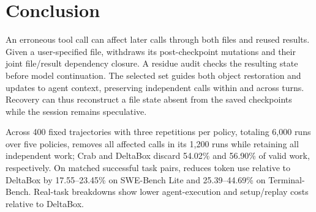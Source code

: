 \section{Conclusion}

An erroneous tool call can affect later calls through both files and reused
results. Given a user-specified file, \system withdraws its post-checkpoint
mutations and their joint file/result dependency closure. A residue audit
checks the resulting state before model continuation. The selected set guides both
object restoration and updates to agent context, preserving independent
calls within and across turns. Recovery can thus reconstruct a file state
absent from the saved checkpoints while the session remains speculative.

Across 400 fixed trajectories with three repetitions per policy, totaling
6,000 runs over five policies, \system removes all affected calls in its
1,200 runs while retaining all independent work; Crab and DeltaBox
discard 54.02\% and 56.90\% of valid work, respectively.
On matched successful task pairs, \system reduces token use relative to
DeltaBox by 17.55--23.45\% on SWE-Bench Lite and 25.39--44.69\% on
Terminal-Bench. Real-task breakdowns show lower agent-execution and
setup/replay costs relative to DeltaBox.
